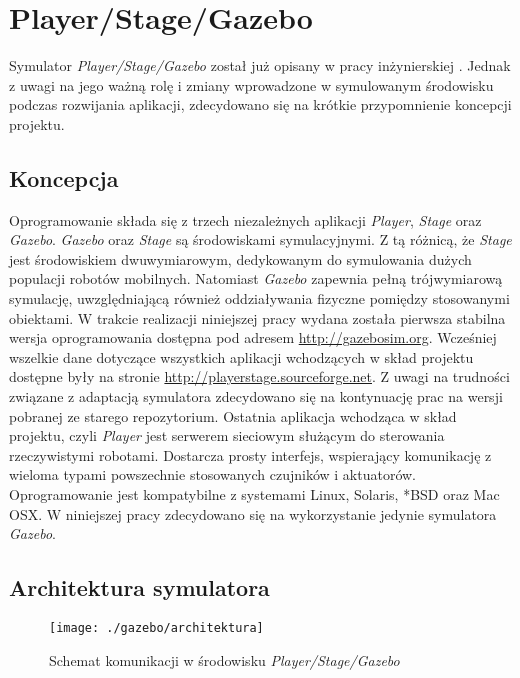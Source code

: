 \chapter[Player/Stage/Gazebo ]{Player/Stage/Gazebo \label{chap:gazebo}}
	Symulator \mbox{\textit{Player/Stage/Gazebo}} został już opisany w pracy inżynierskiej \cite{inzynierka}. Jednak z uwagi na jego ważną rolę i zmiany wprowadzone w symulowanym
	środowisku podczas rozwijania aplikacji, zdecydowano się na krótkie przypomnienie koncepcji projektu.

	\section{Koncepcja}
	Oprogramowanie składa się z trzech niezależnych aplikacji \textit{Player}, \textit{Stage} oraz \textit{Gazebo}.
	\textit{Gazebo} oraz \textit{Stage} są środowiskami symulacyjnymi. Z tą różnicą, że \textit{Stage} jest środowiskiem dwuwymiarowym, dedykowanym do symulowania dużych populacji robotów
	mobilnych. Natomiast \textit{Gazebo} zapewnia pełną trójwymiarową symulację, uwzględniającą również oddziaływania fizyczne pomiędzy stosowanymi obiektami.
	W trakcie realizacji niniejszej pracy wydana została pierwsza stabilna wersja oprogramowania dostępna pod adresem \url{http://gazebosim.org}.
	Wcześniej wszelkie dane dotyczące wszystkich aplikacji wchodzących w skład projektu dostępne były na stronie \url{http://playerstage.sourceforge.net}. Z uwagi na trudności związane z adaptacją
	symulatora zdecydowano się na kontynuację prac na wersji pobranej ze starego repozytorium.
	Ostatnia aplikacja wchodząca w skład projektu, czyli \textit{Player} jest serwerem sieciowym służącym do sterowania rzeczywistymi robotami. Dostarcza prosty interfejs, wspierający komunikację z wieloma 
	typami powszechnie stosowanych czujników i aktuatorów.
	Oprogramowanie jest kompatybilne z systemami Linux, Solaris, *BSD oraz Mac OSX.
	W niniejszej pracy zdecydowano się na wykorzystanie jedynie symulatora \textit{Gazebo}.

	\section{Architektura symulatora}
	\begin{figure}[!b]
	\centering
	\texttt{[image: ./gazebo/architektura]}
	\caption{Schemat komunikacji w środowisku \textit{Player/Stage/Gazebo} \label{fig:arch}}
	\end{figure}
	
